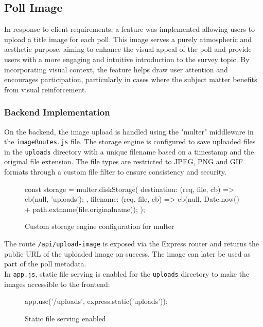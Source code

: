 \documentclass[a4paper,12pt]{report}
\begin{document}
\subsection{Poll Image}
In response to client requirements, a feature was implemented allowing users to upload a title image for each poll. This image serves a purely atmospheric and aesthetic purpose, aiming to enhance the visual appeal of the poll and provide users with a more engaging and intuitive introduction to the survey topic. By incorporating visual context, the feature helps draw user attention and encourages participation, particularly in cases where the subject matter benefits from visual reinforcement.
\subsubsection{Backend Implementation}
On the backend, the image upload is handled using the "multer" middleware in the \texttt{imageRoutes.js} file. The storage engine is configured to save uploaded files in the \texttt{uploads} directory with a unique filename based on a timestamp and the original file extension. The file types are restricted to JPEG, PNG and GIF formats through a custom file filter to ensure consistency and security. \parencite{expressmulter}
\begin{figure}[H]
	\begin{code}
		const storage = multer.diskStorage({
			destination: (req, file, cb) => {
				cb(null, 'uploads');
			},
			filename: (req, file, cb) => {
				cb(null, Date.now() + path.extname(file.originalname));
			}
		});
	\end{code}
	\caption{Custom storage engine configuration for multer}
	\label{fig:multer_config}
\end{figure}
\noindent
The route \texttt{/api/upload-image} is exposed via the Express router and returns the public URL of the uploaded image on success. The image can later be used as part of the poll metadata.\\
In \texttt{app.js}, static file serving is enabled for the \texttt{uploads} directory to make the images accessible to the frontend:
\begin{figure}[H]
	\begin{code}
		app.use('/uploads', express.static('uploads'));
	\end{code}
	\caption{Static file serving enabled}
	\label{fig:static_file_serving}
\end{figure}
\end{document}
